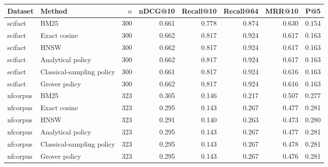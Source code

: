 \begin{tabular}{llrrrrrr}
\toprule
Dataset & Method & $n$ & nDCG@10 & Recall@10 & Recall@64 & MRR@10 & P@5\\
\midrule
scifact & BM25 & 300 & 0.661 & 0.778 & 0.874 & 0.630 & 0.154\\
scifact & Exact cosine & 300 & 0.662 & 0.817 & 0.924 & 0.617 & 0.163\\
scifact & HNSW & 300 & 0.662 & 0.817 & 0.924 & 0.617 & 0.163\\
scifact & Analytical policy & 300 & 0.662 & 0.817 & 0.924 & 0.617 & 0.163\\
scifact & Classical-sampling policy & 300 & 0.661 & 0.817 & 0.924 & 0.616 & 0.163\\
scifact & Grover policy & 300 & 0.662 & 0.817 & 0.924 & 0.616 & 0.163\\
nfcorpus & BM25 & 323 & 0.305 & 0.146 & 0.217 & 0.507 & 0.277\\
nfcorpus & Exact cosine & 323 & 0.295 & 0.143 & 0.267 & 0.477 & 0.281\\
nfcorpus & HNSW & 323 & 0.291 & 0.140 & 0.263 & 0.473 & 0.280\\
nfcorpus & Analytical policy & 323 & 0.295 & 0.143 & 0.267 & 0.477 & 0.281\\
nfcorpus & Classical-sampling policy & 323 & 0.295 & 0.143 & 0.267 & 0.478 & 0.281\\
nfcorpus & Grover policy & 323 & 0.295 & 0.143 & 0.267 & 0.476 & 0.281\\
\bottomrule
\end{tabular}
